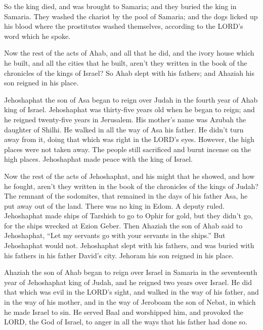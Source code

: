  So the king died, and was brought to Samaria; and they
buried the king in Samaria.  They washed the chariot by the
pool of Samaria; and the dogs licked up his blood where the prostitutes
washed themselves, according to the LORD's word which he spoke.

 Now the rest of the acts of Ahab, and all that he did, and
the ivory house which he built, and all the cities that he built, aren't
they written in the book of the chronicles of the kings of Israel?
 So Ahab slept with his fathers; and Ahaziah his son
reigned in his place.

 Jehoshaphat the son of Asa began to reign over Judah in
the fourth year of Ahab king of Israel.  Jehoshaphat was
thirty-five years old when he began to reign; and he reigned twenty-five
years in Jerusalem. His mother's name was Azubah the daughter of Shilhi.
 He walked in all the way of Asa his father. He didn't turn
away from it, doing that which was right in the LORD's eyes. However,
the high places were not taken away. The people still sacrificed and
burnt incense on the high places.  Jehoshaphat made peace
with the king of Israel.

 Now the rest of the acts of Jehoshaphat, and his might
that he showed, and how he fought, aren't they written in the book of
the chronicles of the kings of Judah?  The remnant of the
sodomites, that remained in the days of his father Asa, he put away out
of the land.  There was no king in Edom. A deputy ruled.
 Jehoshaphat made ships of Tarshish to go to Ophir for
gold, but they didn't go, for the ships wrecked at Ezion Geber.
 Then Ahaziah the son of Ahab said to Jehoshaphat, ``Let my
servants go with your servants in the ships.'' But Jehoshaphat would
not.  Jehoshaphat slept with his fathers, and was buried
with his fathers in his father David's city. Jehoram his son reigned in
his place.

 Ahaziah the son of Ahab began to reign over Israel in
Samaria in the seventeenth year of Jehoshaphat king of Judah, and he
reigned two years over Israel.  He did that which was evil
in the LORD's sight, and walked in the way of his father, and in the way
of his mother, and in the way of Jeroboam the son of Nebat, in which he
made Israel to sin.  He served Baal and worshipped him, and
provoked the LORD, the God of Israel, to anger in all the ways that his
father had done so.
